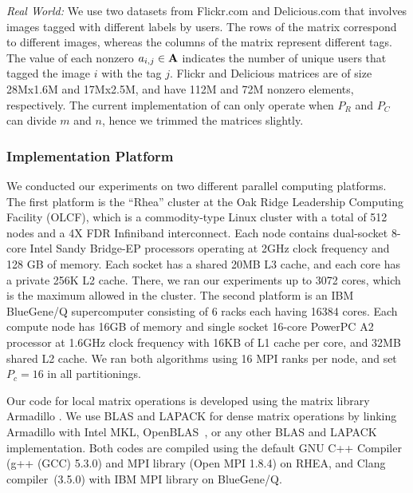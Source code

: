 {\em Real World:} We use two datasets from Flickr.com and Delicious.com that involves images tagged with different labels by users.
The rows of the matrix correspond to different images, whereas the columns of the matrix represent different tags. The value of 
each nonzero $a_{i,j} \in \mathbf{A}$ indicates the number of unique users that tagged the image $i$ with the tag $j$.
Flickr and Delicious matrices are of size 28Mx1.6M and 17Mx2.5M, and have 112M and 72M nonzero elements, respectively.
The current implementation of \mpifaun can only operate when $P_R$ and $P_C$ can divide $m$ and $n$, hence we trimmed the matrices slightly.

\subsubsection{Implementation Platform}
We conducted our experiments on two different parallel computing platforms.
The first platform is the ``Rhea'' cluster at the Oak Ridge Leadership Computing Facility (OLCF), which is a commodity-type Linux cluster with a total of 512 nodes and a 4X FDR Infiniband interconnect.
Each node contains dual-socket 8-core Intel Sandy Bridge-EP processors operating at 2GHz clock frequency and 128 GB of memory.
Each socket has a shared 20MB L3 cache, and each core has a private 256K L2 cache. 
There, we ran our experiments up to 3072 cores, which is the maximum allowed in the cluster.
The second platform is an IBM BlueGene/Q supercomputer consisting of 6 racks each having 16384 cores.
Each compute node has 16GB of memory and single socket 16-core PowerPC A2 processor at 1.6GHz clock frequency with 16KB of L1 cache per core, and 32MB shared L2 cache.
We ran both algorithms using 16 MPI ranks per node, and set $P_c = 16$ in all partitionings.

Our code for local matrix operations is developed using the matrix library Armadillo \cite{sanderson2010}. 
We use BLAS and LAPACK for dense matrix operations by linking Armadillo with Intel MKL, OpenBLAS~\cite{xianyi2015}, or any other BLAS and LAPACK implementation.
Both codes are compiled using the default GNU C++ Compiler (g++ (GCC) 5.3.0) and MPI library (Open MPI 1.8.4) on RHEA, and Clang compiler~(3.5.0) with IBM MPI library on BlueGene/Q.



